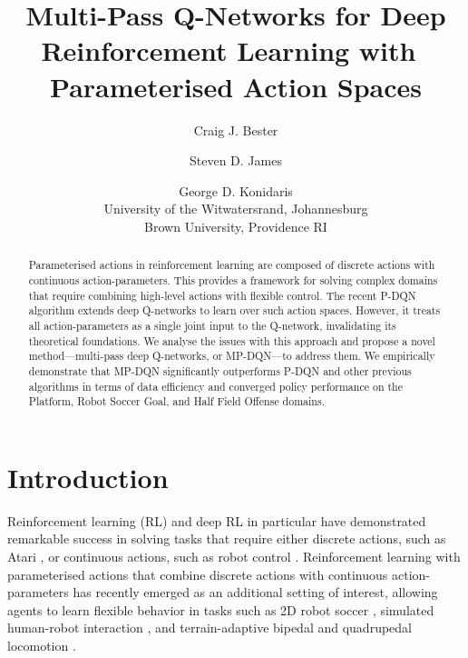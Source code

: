 \documentclass{article}
\title{Multi-Pass Q-Networks for Deep Reinforcement Learning with~\\Parameterised Action Spaces}
\author{
Craig J. Bester\and Steven D. James\and
George D. Konidaris\\
\affiliations
University of the Witwatersrand, Johannesburg\\
Brown University, Providence RI\\
}
\def\PDQN*{P\nobreakdash-DQN}
\def\MPDQN*{MP\nobreakdash-DQN}
\newcommand{\citep}{\cite}
\begin{document}
\maketitle

\begin{abstract}
Parameterised actions in reinforcement learning are composed of discrete actions with continuous action-parameters. This provides a framework for solving complex domains that require combining high-level actions with flexible control. The recent \PDQN* algorithm extends deep Q-networks to learn over such action spaces. However, it treats all action-parameters as a single joint input to the Q-network, invalidating its theoretical foundations. We analyse the issues with this approach and propose a novel method---multi-pass deep Q-networks, or \MPDQN*---to address them. We empirically demonstrate that \MPDQN* significantly outperforms \PDQN* and other previous algorithms in terms of data efficiency and converged policy performance on the Platform, Robot Soccer Goal, and Half Field Offense domains.
\end{abstract}


\section{Introduction}

Reinforcement learning (RL) and deep RL in particular have demonstrated remarkable success in solving tasks that require either discrete actions, such as Atari \citep{mnih2015}, or continuous actions, such as robot control \citep{schulman2015,lillicrap2015}. Reinforcement learning with parameterised actions \citep{masson2016} that combine discrete actions with continuous action-parameters has recently 
emerged as an additional setting of interest,  
allowing agents to learn flexible behavior in tasks such as 2D robot soccer
\citep{hausknecht2016,hussein2018}, simulated human-robot interaction \citep{khamassi2017}, and terrain-adaptive bipedal and quadrupedal locomotion \citep{peng2016}.
\end{document}

